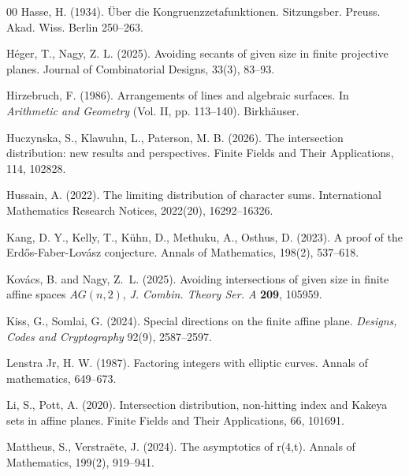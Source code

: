 \documentclass[10pt]{article}
\theoremstyle{definition}
\begin{document}
\begin{thebibliography}{00}
		 Hasse, H. (1934). Über die Kongruenzzetafunktionen. Sitzungsber. Preuss. Akad. Wiss. Berlin  250–263.
		
		
		 Héger, T.,  Nagy, Z. L. (2025). Avoiding secants of given size in finite projective planes. Journal of Combinatorial Designs, 33(3), 83--93.
		
		
		Hirzebruch, F. (1986).
		\newblock Arrangements of lines and algebraic surfaces.
		\newblock In {\em Arithmetic and Geometry} (Vol. II, pp. 113--140). Birkh\"auser.
		
		Huczynska, S., Klawuhn, L., Paterson, M. B. (2026). The intersection distribution: new results and perspectives. Finite Fields and Their Applications, 114, 102828.
		
		 Hussain, A. (2022). The limiting distribution of character sums. International Mathematics Research Notices, 2022(20), 16292--16326.
		
		
		Kang, D. Y., Kelly, T., Kühn, D., Methuku, A.,    Osthus, D. (2023). A proof of the Erd\H os-Faber-Lovász conjecture. Annals of Mathematics, 198(2), 537--618.
		
		
		Kov\'acs, B. and  Nagy, Z.~L.  (2025).
		\newblock Avoiding intersections of given size in finite affine spaces
		\(AG(n,2)\),
		\newblock \emph{J. Combin. Theory Ser. A} \textbf{209}, 105959.
		
		Kiss, G.,  Somlai, G. (2024). Special directions on the finite affine plane. \textit{Designs, Codes and Cryptography}  92(9), 2587--2597.
		
		Lenstra Jr, H. W. (1987). Factoring integers with elliptic curves. Annals of mathematics, 649--673.
		
		
		 Li, S.,  Pott, A. (2020). Intersection distribution, non-hitting index and Kakeya sets in affine planes. Finite Fields and Their Applications, 66,  101691.
		
		 Mattheus, S.,  Verstra\"ete, J. (2024). The asymptotics of r(4,t). Annals of Mathematics, 199(2), 919--941.
		

\end{thebibliography}
\end{document}
